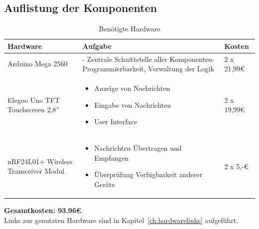 \documentclass[a4paper, 11pt]{scrartcl}
\begin{document}
\subsection{Auflistung der Komponenten}
\begin{small}

\begin{table}[H]
    \caption{Benötigte Hardware}\label{tab:hardware}
    \begin{tabular}{|p{}|p{}|p{}|}
        \hline
        \textbf{Hardware} & \textbf{Aufgabe} & \textbf{Kosten}
        \\
        \hline\hline
        Arduino Mega 2560 
        & 
        - Zentrale Schnittstelle aller Komponenten\newline - Programmierbarkeit, Verwaltung der Logik
        & 
        2 x 21,99€
        \\
        \hline
        Elegoo Uno TFT Touchscreen 2,8''
        &
        \begin{itemize}
            \item Anzeige von Nachrichten
            \item Eingabe von Nachrichten
            \item User Interface
        \end{itemize}
        &
        2 x 19,99€
        \\
        \hline
        nRF24L01+ Wireless Transceiver Modul
        &
        \begin{itemize}
            \item Nachrichten Übertragen und Empfangen
            \item Überprüfung Verfügbarkeit anderer Geräte
        \end{itemize}
        &
        2 x 5,-€
        \\
        \hline
    \end{tabular}
\end{table}
\textbf{Gesamtkosten: 93.96€}. 
\\
Links zur genutzten Hardware sind in Kapitel~\ref{ch:hardwarelinks} aufgeführt.


\end{small}
\end{document}
